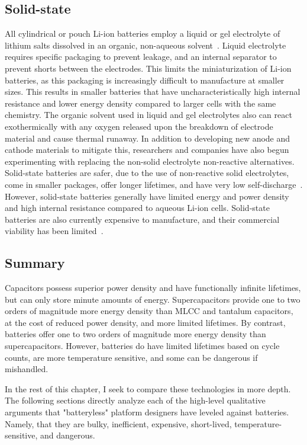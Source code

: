 \subsection{Solid-state}
All cylindrical or pouch Li-ion batteries employ a liquid or gel electrolyte of lithium salts dissolved in an organic, non-aqueous solvent~\cite{doughty2012general}. Liquid electrolyte requires specific packaging to prevent leakage, and an internal separator to prevent shorts between the electrodes. This limits the miniaturization of Li-ion batteries, as this packaging is increasingly difficult to manufacture at smaller sizes. This results in smaller batteries that have uncharacteristically high internal resistance and lower energy density compared to larger cells with the same chemistry.
The organic solvent used in liquid and gel electrolytes also can react exothermically with any oxygen released upon the breakdown of electrode material and cause thermal runaway. In addition to developing new anode and cathode materials to mitigate this, researchers and companies have also begun experimenting with replacing the non-solid electrolyte non-reactive alternatives. Solid-state batteries are safer, due to the use of non-reactive solid electrolytes, come in smaller packages, offer longer lifetimes, and have very low self-discharge~\cite{kim2015review}. However, solid-state batteries generally have limited energy and power density and high internal resistance compared to aqueous Li-ion cells. Solid-state batteries are also currently expensive to manufacture, and their commercial viability has been limited~\cite{kim2015review}.

\subsection{Summary}
Capacitors possess superior power density and have functionally infinite lifetimes, but can only store minute amounts of energy. Supercapacitors provide one to two orders of magnitude more energy density than MLCC and tantalum capacitors, at the cost of reduced power density, and more limited lifetimes. By contrast, batteries offer one to two orders of magnitude more energy density than supercapacitors. However, batteries do have limited lifetimes based on cycle counts, are more temperature sensitive, and some can be dangerous if mishandled. 

In the rest of this chapter, I seek to compare these technologies in more depth. The following sections directly analyze each of the high-level qualitative arguments that "batteryless" platform designers have leveled against batteries. Namely, that they are bulky, inefficient, expensive, short-lived, temperature-sensitive, and dangerous. 


